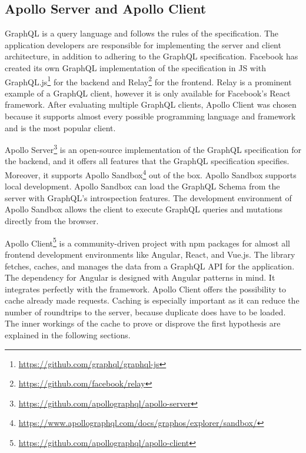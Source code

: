 \subsection{Apollo Server and Apollo Client}\label{subsection:background:graphql:apollo-server-client}

GraphQL is a query language and follows the rules of the specification. The application developers are responsible for implementing the server and client architecture, in addition to adhering to the GraphQL specification. Facebook has created its own GraphQL implementation of the specification in \ac{JS} with GraphQL.js\footnote{\url{https://github.com/graphql/graphql-js}} for the backend and Relay\footnote{\url{https://github.com/facebook/relay}} for the frontend. Relay is a prominent example of a GraphQL client, however it is only available for Facebook's React framework. After evaluating multiple GraphQL clients, Apollo Client was chosen because it supports almost every possible programming language and framework and is the most popular client.

\bigskip

\noindent Apollo Server\footnote{\url{https://github.com/apollographql/apollo-server}} is an open-source implementation of the GraphQL specification for the backend, and it offers all features that the GraphQL specification specifies. Moreover, it supports Apollo Sandbox\footnote{\url{https://www.apollographql.com/docs/graphos/explorer/sandbox/}} out of the box. \cite{misc:-:background:graphql:apollo-server-introduction} Apollo Sandbox supports local development. Apollo Sandbox can load the GraphQL Schema from the server with GraphQL's introspection features. \cite{misc:-:background:graphql:apollo-sandbox} The development environment of Apollo Sandbox allows the client to execute GraphQL queries and mutations directly from the browser.

\bigskip

\noindent Apollo Client\footnote{\url{https://github.com/apollographql/apollo-client}} is a community-driven project with npm packages for almost all frontend development environments like Angular, React, and Vue.js. The library fetches, caches, and manages the data from a GraphQL \ac{API} for the application. The dependency for Angular is designed with Angular patterns in mind. It integrates perfectly with the framework. Apollo Client offers the possibility to cache already made requests. \cite{misc:-:background:graphql:apollo-angular-client-overview, misc:-:background:graphql:apollo-client-overview} Caching is especially important as it can reduce the number of roundtrips to the server, because duplicate does have to be loaded. The inner workings of the cache to prove or disprove the first hypothesis are explained in the following sections.

